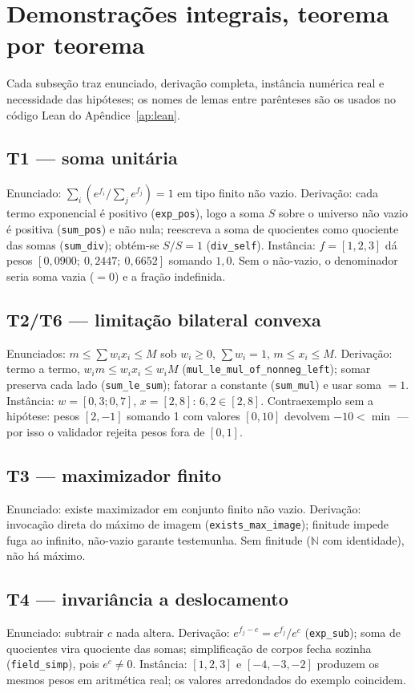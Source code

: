 \section{Demonstrações integrais, teorema por teorema}
Cada subseção traz enunciado, derivação completa, instância numérica real e necessidade das hipóteses; os nomes de lemas entre parênteses são os usados no código Lean do Apêndice~\ref{ap:lean}.
\subsection{T1 --- soma unitária}
Enunciado: $\sum_i(e^{f_i}/\sum_j e^{f_j})=1$ em tipo finito não vazio. Derivação: cada termo exponencial é positivo (\texttt{exp\_pos}), logo a soma $S$ sobre o universo não vazio é positiva (\texttt{sum\_pos}) e não nula; reescreva a soma de quocientes como quociente das somas (\texttt{sum\_div}); obtém-se $S/S=1$ (\texttt{div\_self}). Instância: $f=[1,2,3]$ dá pesos $[0{,}0900;\ 0{,}2447;\ 0{,}6652]$ somando $1{,}0$. Sem o não-vazio, o denominador seria soma vazia ($=0$) e a fração indefinida.
\subsection{T2/T6 --- limitação bilateral convexa}
Enunciados: $m\leq\sum w_ix_i\leq M$ sob $w_i\geq0$, $\sum w_i=1$, $m\leq x_i\leq M$. Derivação: termo a termo, $w_im\leq w_ix_i\leq w_iM$ (\nolinkurl{mul_le_mul_of_nonneg_left}); somar preserva cada lado (\texttt{sum\_le\_sum}); fatorar a constante (\texttt{sum\_mul}) e usar soma $=1$. Instância: $w=[0{,}3;0{,}7]$, $x=[2,8]$: $6{,}2\in[2,8]$. Contraexemplo sem a hipótese: pesos $[2,-1]$ somando 1 com valores $[0,10]$ devolvem $-10<\min$ --- por isso o validador rejeita pesos fora de $[0,1]$.
\subsection{T3 --- maximizador finito}
Enunciado: existe maximizador em conjunto finito não vazio. Derivação: invocação direta do máximo de imagem (\texttt{exists\_max\_image}); finitude impede fuga ao infinito, não-vazio garante testemunha. Sem finitude ($\mathbb{N}$ com identidade), não há máximo.
\subsection{T4 --- invariância a deslocamento}
Enunciado: subtrair $c$ nada altera. Derivação: $e^{f_j-c}=e^{f_j}/e^c$ (\texttt{exp\_sub}); soma de quocientes vira quociente das somas; simplificação de corpos fecha sozinha (\texttt{field\_simp}), pois $e^c\neq0$. Instância: $[1,2,3]$ e $[-4,-3,-2]$ produzem os mesmos pesos em aritmética real; os valores arredondados do exemplo coincidem.
